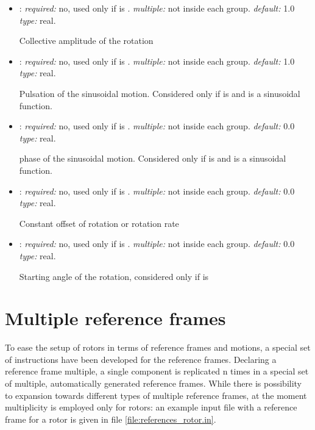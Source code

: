\begin{itemize}
\begin{itemize}
    \item {}: \textit{required:} no, used only if  
    is . \textit{multiple:} not inside each  group. 
    \textit{default:} 1.0 \textit{type:} real.
    
    Collective amplitude of the rotation 
    
    \item {}: \textit{required:} no, used only if  
    is . \textit{multiple:} not inside each  group. 
    \textit{default:} 1.0 \textit{type:} real.
    
    Pulsation of the sinusoidal motion. Considered only if  is 
     and  is a sinusoidal function.
    
        \item {}: \textit{required:} no, used only if 
         is . \textit{multiple:} not 
        inside each  group. \textit{default:} 0.0 \textit{type:} real.
    
    phase of the sinusoidal motion. Considered only if  is 
     and  is a sinusoidal function.
    
    \item {}: \textit{required:} no, used only if  
    is . \textit{multiple:} not inside each  group. 
    \textit{default:} 0.0 \textit{type:} real.
    
    Constant offset of rotation or rotation rate
    
    \item {}: \textit{required:} no, used only if  
    is . \textit{multiple:} not inside each  group. 
    \textit{default:} 0.0 \textit{type:} real.
    
    Starting angle of the rotation, considered only if  is 
    
    \end{itemize}

\end{itemize}



\section{Multiple reference frames}
To ease the setup of rotors in terms of reference frames and motions, 
a special set of instructions have been developed for the reference frames. 
Declaring a reference frame multiple, a single component is replicated n times 
in a special set of multiple, automatically generated reference frames. 
While there is possibility to expansion towards different types of multiple 
reference frames, at the moment multiplicity is employed only for rotors: an 
example input file with a reference frame for a rotor is given in file 
\ref{file:references_rotor.in}. 

